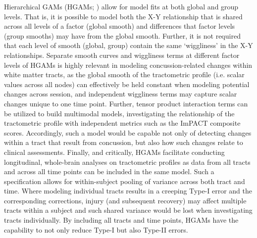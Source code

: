 \documentclass[12pt]{article}
\begin{document}
Hierarchical GAMs (HGAMs; \cite{pedersen2019HierarchicalGeneralizedAdditive}) allow for model fits at both global and group levels. That is, it is possible to model both the X-Y relationship that is shared across all levels of a factor (global smooth) and differences that factor levels (group smooths) may have from the global smooth. Further, it is not required that each level of smooth (global, group) contain the same `wiggliness' in the X-Y relationships. Separate smooth curves and wiggliness terms at different factor levels of HGAMs is highly relevant in modeling concussion-related changes within white matter tracts, as the global smooth of the tractometric profile (i.e. scalar values across all nodes) can effectively be held constant when modeling potential changes across session, and independent wiggliness terms may capture scalar changes unique to one time point. Further, tensor product interaction terms can be utilized to build multimodal models, investigating the relationship of the tractometric profile with independent metrics such as the ImPACT composite scores. Accordingly, such a model would be capable not only of detecting changes within a tract that result from concussion, but also how such changes relate to clinical assessments. Finally, and critically, HGAMs facilitate conducting longitudinal, whole-brain analyses on tractometric profiles as data from all tracts and across all time points can be included in the same model. Such a specification allows for within-subject pooling of variance across both tract and time. Where modeling individual tracts results in a creeping Type-I error and the corresponding corrections, injury (and subsequent recovery) may affect multiple tracts within a subject and such shared variance would be lost when investigating tracts individually. By including all tracts and time points, HGAMs have the capability to not only reduce Type-I but also Type-II errors.

\end{document}

